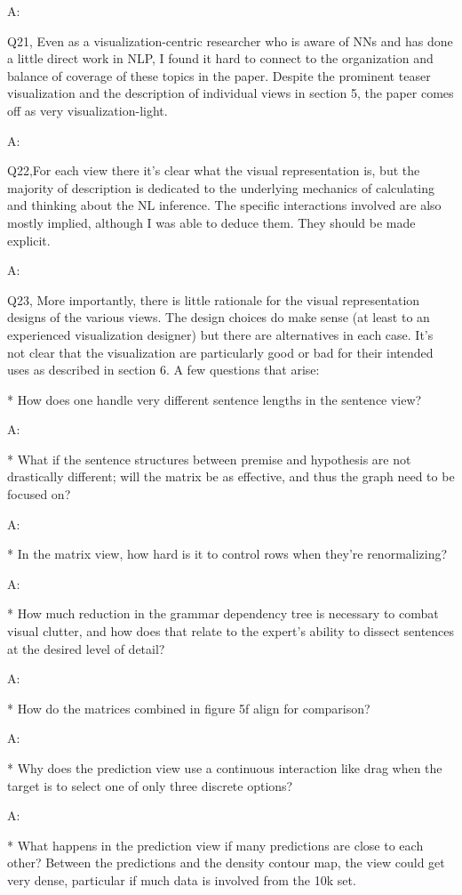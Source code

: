 A:

Q21, Even as a visualization-centric researcher who is aware of NNs and has done a little direct work in NLP, I found it hard to connect to the organization and balance of coverage of these topics in the paper. Despite the prominent teaser visualization and the description of individual views in section 5, the paper comes off as very visualization-light.

A:

Q22,For each view there it's clear what the visual representation is, but the majority of description is dedicated to the underlying mechanics of calculating and thinking about the NL inference. The specific interactions involved are also mostly implied, although I was able to deduce them. They should be made explicit.

A:

Q23, More importantly, there is little rationale for the visual representation designs of the various views. The design choices do make sense (at least to an experienced visualization designer) but there are alternatives in each case. It's not clear that the visualization are particularly good or bad for their intended uses as described in section 6. A few questions that arise:

* How does one handle very different sentence lengths in the sentence view?

A:

* What if the sentence structures between premise and hypothesis are not drastically different; will the matrix be as effective, and thus the graph need to be focused on?

A:

* In the matrix view, how hard is it to control rows when they're renormalizing?

A:

* How much reduction in the grammar dependency tree is necessary to combat visual clutter, and how does that relate to the expert's ability to dissect sentences at the desired level of detail?

A:

* How do the matrices combined in figure 5f align for comparison?

A:

* Why does the prediction view use a continuous interaction like drag when the target is to select one of only three discrete options?

A:

* What happens in the prediction view if many predictions are close to each other? Between the predictions and the density contour map, the view could get very dense, particular if much data is involved from the 10k set.

